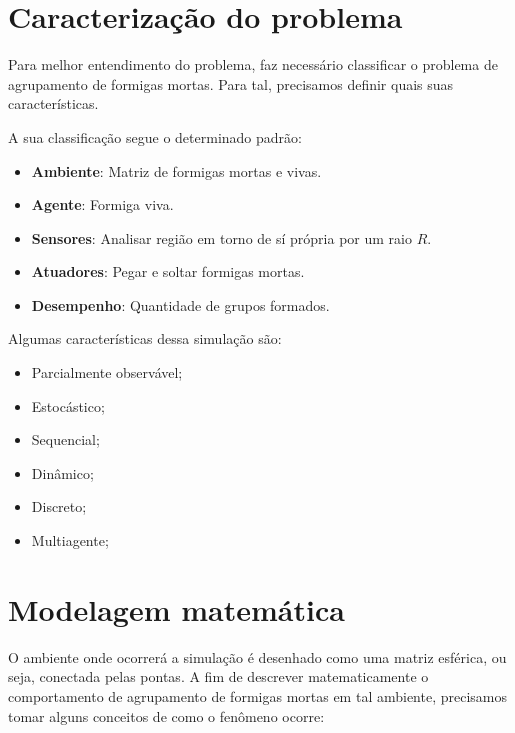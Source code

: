 \documentclass[conference]{IEEEtran}
\begin{document}
\section{Caracterização do problema}

Para melhor entendimento do problema, faz necessário classificar o problema de agrupamento de formigas mortas. Para tal, precisamos definir quais suas características\cite{b1}.

A sua classificação segue o determinado padrão:

\begin{itemize}
    \item \textbf{Ambiente}: Matriz de formigas mortas e vivas.
    \item \textbf{Agente}: Formiga viva.
    \item \textbf{Sensores}: Analisar região em torno de sí própria por um raio $R$.
    \item \textbf{Atuadores}: Pegar e soltar formigas mortas.
    \item \textbf{Desempenho}: Quantidade de grupos formados.
\end{itemize}

Algumas características dessa simulação são:

\begin{itemize}
    \item Parcialmente observável;
    \item Estocástico;
    \item Sequencial;
    \item Dinâmico;
    \item Discreto;
    \item Multiagente;
\end{itemize}

\section{Modelagem matemática}

O ambiente onde ocorrerá a simulação é desenhado como uma matriz esférica, ou seja, conectada pelas pontas. A fim de descrever matematicamente o comportamento de agrupamento de formigas mortas em tal ambiente, precisamos tomar alguns conceitos de como o fenômeno ocorre\cite{b1}:
\end{document}
